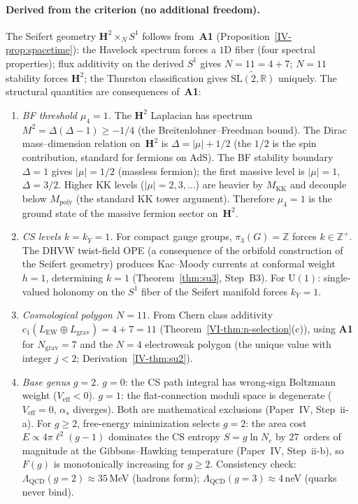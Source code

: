 \paragraph{Derived from the criterion (no additional freedom).}
The Seifert geometry $\mathbf{H}^2 \times_N S^1$
follows from~\textbf{A1}
(Proposition~\ref*{IV-prop:spacetime}):
the Havelock spectrum forces a $1$D fiber
(four spectral properties);
flux additivity on the derived $S^1$ gives $N = 11 = 4 + 7$;
$N = 11$ stability forces $\mathbf{H}^2$;
the Thurston classification gives
$\widetilde{\mathrm{SL}(2,\mathbb{R})}$ uniquely.
The structural quantities are consequences
of~\textbf{A1}:
\begin{enumerate}
\item \emph{BF threshold $\mu_4 = 1$.}
  The $\mathbf{H}^2$ Laplacian has spectrum
  $M^2 = \Delta(\Delta{-}1) \ge -1/4$
  (the Breitenlohner--Freedman bound).
  The Dirac mass--dimension relation on~$\mathbf{H}^2$
  is $\Delta = |\mu| + 1/2$ (the $1/2$ is the spin
  contribution, standard for fermions on AdS).
  The BF stability boundary $\Delta = 1$ gives
  $|\mu| = 1/2$ (massless fermion); the first massive
  level is $|\mu| = 1$, $\Delta = 3/2$.
  Higher KK levels ($|\mu| = 2, 3, \ldots$) are heavier
  by $M_{\mathrm{KK}}$ and decouple below
  $M_{\mathrm{poly}}$ (the standard KK tower argument).
  Therefore $\mu_4 = 1$ is the ground state of the
  massive fermion sector on~$\mathbf{H}^2$.
\item \emph{CS levels $k = k_Y = 1$.}
  For compact gauge groups, $\pi_3(G) = \mathbb{Z}$
  forces $k \in \mathbb{Z}^+$.
  The DHVW twist-field OPE (a consequence of the
  orbifold construction of the Seifert geometry) produces
  Kac--Moody currents at conformal weight $h = 1$,
  determining $k = 1$
  (Theorem~\ref{thm:su3}, Step~B3).
  For $\mathrm{U}(1)$: single-valued holonomy
  on the $S^1$ fiber of the Seifert manifold forces
  $k_Y = 1$.
\item \emph{Cosmological polygon $N = 11$.}
  From Chern class additivity
  $c_1(L_{\mathrm{EW}} \oplus L_{\mathrm{grav}})
  = 4 + 7 = 11$
  (Theorem~\ref*{VI-thm:n-selection}(c)),
  using \textbf{A1} for $N_{\mathrm{grav}} = 7$
  and the $N = 4$ electroweak polygon
  (the unique value with integer $j < 2$;
  Derivation~\ref*{IV-thm:su2}).
\item \emph{Base genus $g = 2$.}
  $g = 0$: the CS path integral has wrong-sign
  Boltzmann weight ($V_{\mathrm{eff}} < 0$).
  $g = 1$: the flat-connection moduli space is degenerate
  ($V_{\mathrm{eff}} = 0$, $\alpha_s$ diverges).
  Both are mathematical exclusions
  (Paper~IV, Step~ii-a).
  For $g \ge 2$, free-energy minimization selects
  $g = 2$: the area cost $E \propto 4\pi\ell^2(g{-}1)$
  dominates the CS entropy $S = g\ln N_c$ by $27$~orders
  of magnitude at the Gibbons--Hawking temperature
  (Paper~IV, Step~ii-b), so $F(g)$ is monotonically
  increasing for $g \ge 2$.
  Consistency check: $\Lambda_{\mathrm{QCD}}(g{=}2)
  \approx 35$\,MeV (hadrons form);
  $\Lambda_{\mathrm{QCD}}(g{=}3) \approx 4$\,neV
  (quarks never bind).
\end{enumerate}
